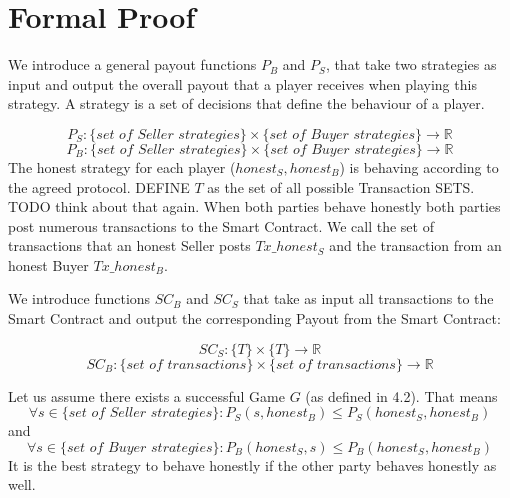 \documentclass{cacthesis}
\begin{document}
\section{Formal Proof}


We introduce a general payout functions $P_B$ and $P_S$, that take two strategies as input and output the overall payout that a player receives when playing this strategy.\newline
A strategy is a set of decisions that define the behaviour of a player. %


\[P_S : \{ \textit{set of Seller strategies}\} \times \{ \textit{set of Buyer strategies}\} \to \mathbb{R}\]
\[P_B : \{ \textit{set of Seller strategies}\} \times \{ \textit{set of Buyer strategies}\} \to \mathbb{R}\]
The honest strategy for each player ($honest_S, honest_B$) is behaving according to the agreed protocol.
DEFINE $T$ as the set of all possible Transaction SETS. TODO think about that again.\newline
When both parties behave honestly both parties post numerous transactions to the Smart Contract. We call the set of transactions that an honest Seller posts $Tx\_honest_S$ and the transaction from an honest Buyer $Tx\_honest_B$.

We introduce functions $SC_B$ and $SC_S$ that take as input all transactions to the Smart Contract and output the corresponding Payout from the Smart Contract:

\[ SC_S : \{T\} \times \{T\} \to \mathbb{R} \]
\[ SC_B : \{ \textit{set of transactions}\} \times \{ \textit{set of transactions}\} \to \mathbb{R} \]

Let us assume there exists a successful Game $G$ (as defined in 4.2). That means
\begin{equation}
    \forall s \in \{\textit{set of Seller strategies}\}: P_S(s, honest_B) \leq P_S(honest_S,honest_B)
\end{equation}
and
\begin{equation}
    \forall s \in \{\textit{set of Buyer strategies}\}: P_B(honest_S, s) \leq P_B(honest_S,honest_B)
\end{equation}
It is the best strategy to behave honestly if the other party behaves honestly as well.\newline
\end{document}
